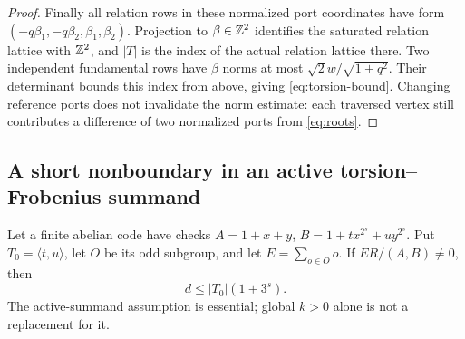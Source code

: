 \begin{proof}
Finally all relation rows in these normalized port coordinates have form $(-q\beta_1,-q\beta_2,\beta_1,\beta_2)$. Projection to $\beta\in\mathbb Z^2$ identifies the saturated relation lattice with $\mathbb Z^2$, and $|T|$ is the index of the actual relation lattice there. Two independent fundamental rows have $\beta$ norms at most $\sqrt2w/\sqrt{1+q^2}$. Their determinant bounds this index from above, giving \eqref{eq:torsion-bound}. Changing reference ports does not invalidate the norm estimate: each traversed vertex still contributes a difference of two normalized ports from \eqref{eq:roots}.
\end{proof}

\subsection{A short nonboundary in an active torsion--Frobenius summand}
\begin{lemma}\label{lem:twist}
Let a finite abelian code have checks $A=1+x+y$, $B=1+t x^{2^s}+u y^{2^s}$. Put $T_0=\langle t,u\rangle$, let $O$ be its odd subgroup, and let $E=\sum_{o\in O}o$. If $ER/(A,B)\ne0$, then
\begin{equation}\label{eq:twist-weight}
 d\le |T_0|(1+3^s).
\end{equation}
The active-summand assumption is essential; global $k>0$ alone is not a replacement for it.
\end{lemma}
